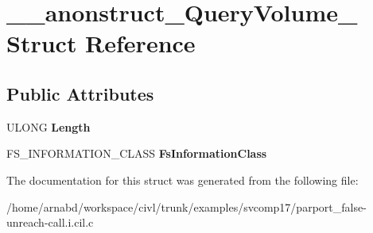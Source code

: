 \hypertarget{struct____anonstruct__QueryVolume__63}{}\section{\+\_\+\+\_\+anonstruct\+\_\+\+Query\+Volume\+\_ Struct Reference}
\label{struct____anonstruct__QueryVolume__63}
\subsection*{Public Attributes}
\begin{DoxyCompactItemize}
\item 
\hypertarget{struct____anonstruct__QueryVolume__63_a86ac18af281c64fe3ef375e20ee4ef01}{}U\+L\+O\+N\+G {\bfseries Length}\label{struct____anonstruct__QueryVolume__63_a86ac18af281c64fe3ef375e20ee4ef01}

\item 
\hypertarget{struct____anonstruct__QueryVolume__63_a3983862319ad241355db0674fff26d87}{}F\+S\+\_\+\+I\+N\+F\+O\+R\+M\+A\+T\+I\+O\+N\+\_\+\+C\+L\+A\+S\+S {\bfseries Fs\+Information\+Class}\label{struct____anonstruct__QueryVolume__63_a3983862319ad241355db0674fff26d87}

\end{DoxyCompactItemize}


The documentation for this struct was generated from the following file\+:\begin{DoxyCompactItemize}
\item 
/home/arnabd/workspace/civl/trunk/examples/svcomp17/parport\+\_\+false-\/unreach-\/call.\+i.\+cil.\+c\end{DoxyCompactItemize}
